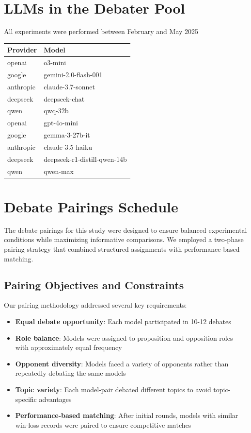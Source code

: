 \documentclass{article}
\begin{document}
\section{LLMs in the Debater Pool}
\label{appendix:llms}
All experiments were performed between February and May 2025
\begin{tabular}{|l|l|}
  \hline
  Provider & Model \\
  \hline
  openai & o3-mini \\
  google & gemini-2.0-flash-001 \\
  anthropic & claude-3.7-sonnet \\
  deepseek & deepseek-chat \\
  qwen & qwq-32b \\
  openai & gpt-4o-mini \\
  google & gemma-3-27b-it \\
  anthropic & claude-3.5-haiku \\
  deepseek & deepseek-r1-distill-qwen-14b \\
  qwen & qwen-max \\
  \hline
  \end{tabular}

  \section{Debate Pairings Schedule}
\label{appendix:pairings}
The debate pairings for this study were designed to ensure balanced experimental conditions while maximizing informative comparisons. We employed a two-phase pairing strategy that combined structured assignments with performance-based matching.


\subsection{Pairing Objectives and Constraints}
Our pairing methodology addressed several key requirements:
\begin{itemize}
\item \textbf{Equal debate opportunity}: Each model participated in 10-12 debates
\item \textbf{Role balance}: Models were assigned to proposition and opposition roles with approximately equal frequency
\item \textbf{Opponent diversity}: Models faced a variety of opponents rather than repeatedly debating the same models
\item \textbf{Topic variety}: Each model-pair debated different topics to avoid topic-specific advantages
\item \textbf{Performance-based matching}: After initial rounds, models with similar win-loss records were paired to ensure competitive matches
\end{itemize}
\end{document}
